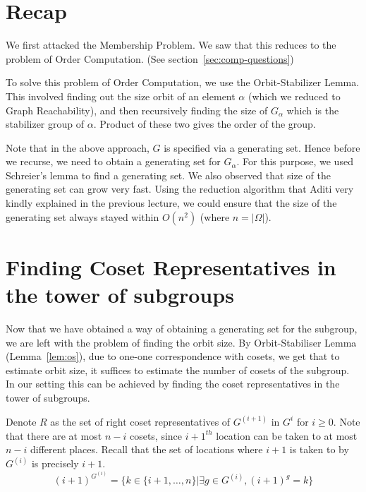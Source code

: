 
\section{Recap}
We first attacked the Membership Problem. We saw that this reduces to the
problem of Order Computation. (See section~\ref{sec:comp-questions}) 

To solve this problem of Order Computation, we use the
Orbit-Stabilizer Lemma. This involved finding out the size orbit of an element
$\alpha$ (which we reduced to Graph Reachability), and then recursively
finding the size of $G_\alpha$ which is the stabilizer group of $\alpha$.
Product of these two gives the order of the group.

Note that in the above approach, $G$ is specified via a generating set. Hence
before we recurse, we need to obtain a generating set for
$G_\alpha$. For this purpose, we used Schreier's lemma to find a generating
set. We also observed that size of the generating set can grow very fast. Using
the reduction algorithm that Aditi very kindly explained in the previous
lecture, we could ensure that the size of the generating set always stayed 
within $O(n^2)$ (where $n = |\Omega|$).

\section{Finding Coset Representatives in the tower of subgroups}
\label{sec:find-coset}
Now that we have obtained a way of obtaining a generating set for the
subgroup, we are left with the problem of finding the orbit size. 
By Orbit-Stabiliser Lemma (Lemma~\ref{lem:os}), due to one-one correspondence
with cosets, we get that to estimate orbit size, it suffices to estimate the
number of cosets of the subgroup. In our setting this can be achieved by
finding the coset representatives in the tower of subgroups.

Denote $R$ as the set of right coset representatives of $G^{(i+1)}$  in $G^i$
for $i \ge 0$. Note that there are at most  $n-i$ cosets, since $i+1^{th}$
location can be taken to at most $n-i$ different places. Recall that the set of
locations where $i+1$ is taken to by $G^{(i)}$ is precisely $i+1$.
\[ (i+1)^{G^{(i)}}=\{ k \in \{i+1, \ldots, n\} | \exists g \in G^{(i)},
(i+1)^g = k\} \]

